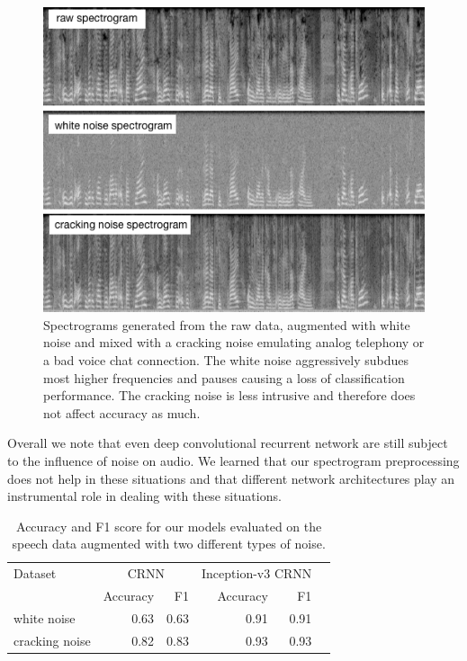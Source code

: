 	\begin{figure}[]
  		\centering
    	\includegraphics[width=\textwidth, keepaspectratio]{img/noise_spectrograms.png}
    	\caption{Spectrograms generated from the raw data, augmented with white noise and mixed with a cracking noise emulating analog telephony or a bad voice chat connection. The white noise aggressively subdues most higher frequencies and pauses causing a loss of classification performance. The cracking noise is less intrusive and therefore does not affect accuracy as much.}
    	\label{fig:noise}
	\end{figure}


Overall we note that even deep convolutional recurrent network are still subject to the influence of noise on audio. We learned that our spectrogram preprocessing does not help in these situations and that different network architectures play an instrumental role in dealing with these situations.
 
	\begin{table}[]
	\centering
	\begin{tabularx}{\textwidth}{lrrrrr}
	\toprule
	Dataset & \multicolumn{2}{c}{CRNN} & \multicolumn{2}{c}{Inception-v3 CRNN} \\  
                & Accuracy  & F1    & Accuracy  & F1   \\ \midrule
white noise     & 0.63      & 0.63  & 0.91      & 0.91 \\
cracking noise  & 0.82      & 0.83  & 0.93      & 0.93 \\
 	\bottomrule
	\end{tabularx}
	\caption{Accuracy and F1 score for our models evaluated on the speech data augmented with two different types of noise.}
	\label{tab:noise}
	\end{table}




